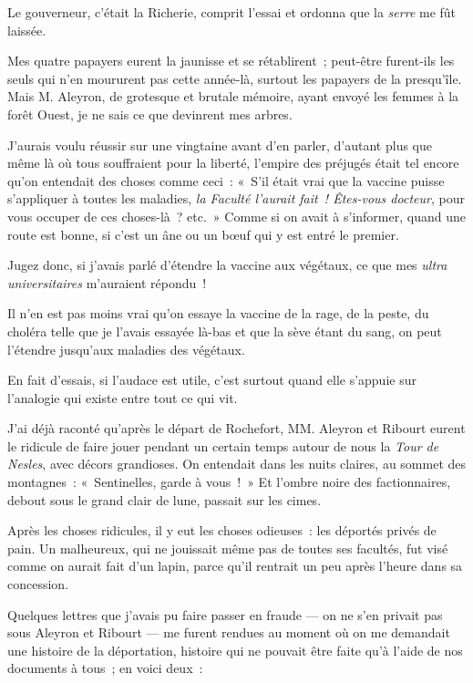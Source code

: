 \documentclass[french,twoside]{book} %
\begin{document}
Le gouverneur, c’était la Richerie, comprit l’essai et ordonna que la \emph{serre} me fût laissée.\par
Mes quatre papayers eurent la jaunisse et se rétablirent ; peut-être furent-ils les seuls qui n’en moururent pas cette année-là, surtout les papayers de la presqu’île. Mais M. Aleyron, de grotesque et brutale mémoire, ayant envoyé les femmes à la forêt Ouest, je ne sais ce que devinrent mes arbres.\par
 J’aurais voulu réussir sur une vingtaine avant d’en parler, d’autant plus que même là où tous souffraient pour la liberté, l’empire des préjugés était tel encore qu’on entendait des choses comme ceci : « S’il était vrai que la vaccine puisse s’appliquer à toutes les maladies, \emph{la Faculté l’aurait fait ! Êtes-vous docteur}, pour vous occuper de ces choses-là ? etc. » Comme si on avait à s’informer, quand une route est bonne, si c’est un âne ou un bœuf qui y est entré le premier.\par
Jugez donc, si j’avais parlé d’étendre la vaccine aux végétaux, ce que mes \emph{ultra universitaires} m’auraient répondu !\par
Il n’en est pas moins vrai qu’on essaye la vaccine de la rage, de la peste, du choléra telle que je l’avais essayée là-bas et que la sève étant du sang, on peut l’étendre jusqu’aux maladies des végétaux.\par
En fait d’essais, si l’audace est utile, c’est surtout quand elle s’appuie sur l’analogie qui existe entre tout ce qui vit.\par
J’ai déjà raconté qu’après le départ de Rochefort, MM. Aleyron et Ribourt eurent le ridicule de faire jouer pendant un certain temps autour de nous la \emph{Tour de Nesles}, avec décors grandioses. On entendait dans les nuits claires, au sommet des montagnes : « Sentinelles, garde à  vous ! » Et l’ombre noire des factionnaires, debout sous le grand clair de lune, passait sur les cimes.\par
Après les choses ridicules, il y eut les choses odieuses : les déportés privés de pain. Un malheureux, qui ne jouissait même pas de toutes ses facultés, fut visé comme on aurait fait d’un lapin, parce qu’il rentrait un peu après l’heure dans sa concession.\par
Quelques lettres que j’avais pu faire passer en fraude — on ne s’en privait pas sous Aleyron et Ribourt — me furent rendues au moment où on me demandait une histoire de la déportation, histoire qui ne pouvait être faite qu’à l’aide de nos documents à tous ; en voici deux :\par
\end{document}
